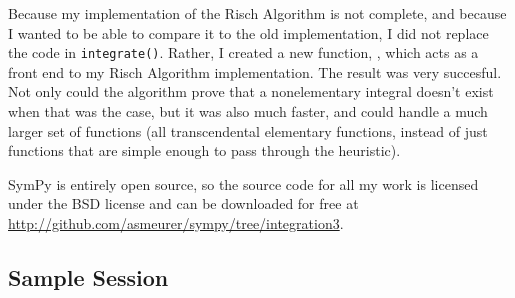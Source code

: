 Because my implementation of the Risch Algorithm is not complete, and
because I wanted to be able to compare it to the old implementation, I
did not replace the code in \texttt{integrate()}.  Rather, I created a
new function, \rischintegrate{}, which acts as a front end to my Risch
Algorithm implementation.  The result was very succesful.  Not only
could the algorithm prove that a nonelementary integral doesn't exist
when that was the case, but it was also much faster, and could handle a
much larger set of functions (all \gls{transcendental} \gls{elementary}
functions, instead of just functions that are simple enough to pass
through the heuristic).  

SymPy is entirely open source, so the source code for all my work
is licensed under the BSD license and can be downloaded for free at
\url{http://github.com/asmeurer/sympy/tree/integration3}.

\subsection{Sample Session} 
\label{sample}

